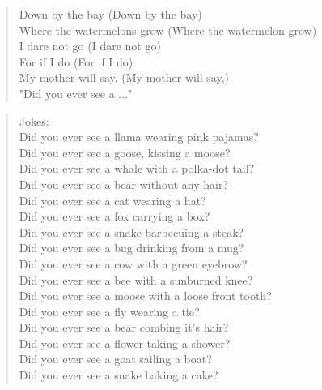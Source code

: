 
\begin{verse}
Down by the bay (Down by the bay) \\

Where the watermelons grow (Where the watermelon grow) \\

I dare not go (I dare not go) \\

For if I do (For if I do) \\

My mother will say, (My mother will say,) \\

"Did you ever see a ..." \\
\end{verse}

\begin{verse}

Jokes:\\

Did you ever see a llama wearing pink pajamas?\\
Did you ever see a goose, kissing a moose?\\
Did you ever see a whale with a polka-dot tail?\\
Did you ever see a bear without any hair?\\
Did you ever see a cat wearing a hat?\\
Did you ever see a fox carrying a box?\\
Did you ever see a snake barbecuing a steak?\\
Did you ever see a bug drinking from a mug?\\
Did you ever see a cow with a green eyebrow?\\
Did you ever see a bee with a sunburned knee?\\
Did you ever see a moose with a loose front tooth?\\
Did you ever see a fly wearing a tie?\\
Did you ever see a bear combing it's hair?\\
Did you ever see a flower taking a shower?\\
Did you ever see a goat sailing a boat?\\
Did you ever see a snake baking a cake?\\

\end{verse}

